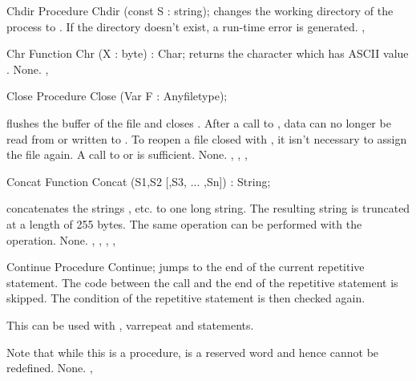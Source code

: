 \documentclass{report}
\begin{document}

\begin{procedure}{Chdir}
\Declaration
Procedure Chdir (const S : string);
\Description
{} changes the working directory of the process to .
\Errors
If the directory  doesn't exist, a run-time error is generated.
\SeeAlso
{}, 
\end{procedure}


\begin{function}{Chr}
\Declaration
Function Chr (X : byte) : Char;
\Description
{} returns the character which has ASCII value .
\Errors
None.
\SeeAlso
{}, 
\end{function}


\begin{procedure}{Close}
\Declaration
Procedure Close (Var F : Anyfiletype);

\Description
{} flushes the buffer of the file  and closes .
After a call to , data can no longer be read from or written to
.
To reopen a file closed with , it isn't necessary to assign the
file again. A call to  or  is sufficient.
\Errors
None.
\SeeAlso
{}, , , 
\end{procedure}


\begin{function}{Concat}
\Declaration
Function Concat (S1,S2 [,S3, ... ,Sn]) : String;

\Description
{} concatenates the strings , etc. to one long
string. The resulting string is truncated at a length of 255 bytes.
The same operation can be performed with the \var{+} operation.
\Errors
None.
\SeeAlso
{}, , , , 
\end{function}


\begin{procedure}{Continue}
\Declaration
Procedure Continue;
\Description
{} jumps to the end of the current repetitive statement. 
The code between the  call and the end of the repetitive 
statement is skipped. The condition of the repetitive statement is then
checked again.

This can be used with , var{repeat} and  statements.

Note that while this is a procedure,  is a reserved word
and hence cannot be redefined.
\Errors
None.
\SeeAlso
{}, 
\end{procedure}
\end{document}
